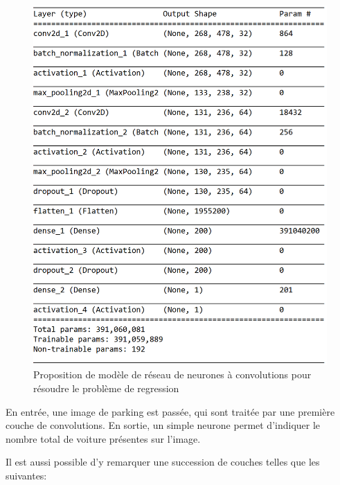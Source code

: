 \begin{figure}[H]
    \includegraphics[width=12cm]{img/conception/nn/regression_keras.png}
    \centering
    \caption{Proposition de modèle de réseau de neurones à convolutions pour résoudre le problème de regression}
    \label{fig:regression_keras}
\end{figure} 

En entrée, une image de parking est passée, qui sont traitée par une première couche de convolutions. En sortie, un simple neurone permet d'indiquer le nombre total de voiture présentes sur l'image. 


Il est aussi possible d'y remarquer une succession de couches telles que les suivantes:

